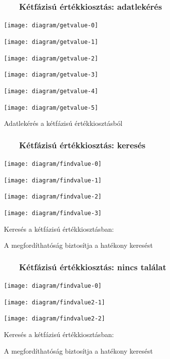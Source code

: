 \documentclass[
]{beamer}
\newcommand{\slidetitle}[2]{\frametitle{{\small #1 ~ \ding{226} ~ } \normalsize \textbf{#2} }}
\begin{document}
\begin{frame}
    \slidetitle{\sectionshorttitle}{Kétfázisú értékkiosztás: adatlekérés}
    
    \centering
    
    \begin{overprint}
        \centerline{\texttt{[image: diagram/getvalue-0]}}
        \centerline{\texttt{[image: diagram/getvalue-1]}}
        \centerline{\texttt{[image: diagram/getvalue-2]}}
        \centerline{\texttt{[image: diagram/getvalue-3]}}
        \centerline{\texttt{[image: diagram/getvalue-4]}}
        \centerline{\texttt{[image: diagram/getvalue-5]}}
    \end{overprint}
    
    \hspace{0.7cm}
    
    Adatlekérés a kétfázisú értékkiosztásból
\end{frame}

\begin{frame}
    \slidetitle{\sectionshorttitle}{Kétfázisú értékkiosztás: keresés}
    
    \centering
    
    \begin{overprint}
        \centerline{\texttt{[image: diagram/findvalue-0]}}
        \centerline{\texttt{[image: diagram/findvalue-1]}}
        \centerline{\texttt{[image: diagram/findvalue-2]}}
        \centerline{\texttt{[image: diagram/findvalue-3]}}
    \end{overprint}
    
    \vspace{0.5cm}
    
    Keresés a kétfázisú értékkiosztásban: \par
    A megfordíthatóság biztosítja a hatékony keresést
\end{frame}

\begin{frame}
    \slidetitle{\sectionshorttitle}{Kétfázisú értékkiosztás: nincs találat}
    
    \centering
    
    \begin{overprint}
        \centerline{\texttt{[image: diagram/findvalue-0]}}
        \centerline{\texttt{[image: diagram/findvalue2-1]}}
        \centerline{\texttt{[image: diagram/findvalue2-2]}}
    \end{overprint}
    
    \vspace{0.5cm}
    
    Keresés a kétfázisú értékkiosztásban: \par
    A megfordíthatóság biztosítja a hatékony keresést
\end{frame}
\end{document}
